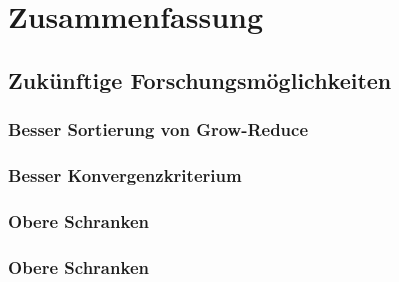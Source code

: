 \documentclass[12pt,a4paper,onecolumn,oneside,titlepage]{article}
\begin{document}
\section{Zusammenfassung}
\subsection{Zukünftige Forschungsmöglichkeiten}
\subsubsection{Besser Sortierung von Grow-Reduce}
\subsubsection{Besser Konvergenzkriterium}
\subsubsection{Obere Schranken}
\subsubsection{Obere Schranken}



\end{document}
